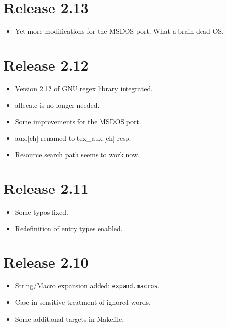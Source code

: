 \documentclass[11pt,a4paper]{scrartcl}
\newcommand\rsc[1]{\texttt{#1}}
\newcommand\File[1]{\textsf{#1}}
\newenvironment{Release}[2]{%
  \def\tmp{#2}%
  \section*{Release #1 \ifx\tmp\empty\else{\normalsize[#2]}\fi}
  \begin{itemize}
}{\end{itemize}}
\newenvironment{Fix}[1]{\item }{}
\newenvironment{New}[1]{\item }{}
\newenvironment{Update}[1]{\item }{}
\begin{document}
\begin{multicols}
 \begin{Release}{2.13}{}
  \begin{New}{gene}
    Yet more modifications for the MSDOS port. What a brain-dead OS.
  \end{New}
 \end{Release}

 \begin{Release}{2.12}{}
  \begin{Update}{gene}
    Version 2.12 of GNU regex library integrated.
  \end{Update}
  \begin{Update}{gene}
    \File{alloca.c} is no longer needed.
  \end{Update}
  \begin{Fix}{gene}
    Some improvements for the MSDOS port.
  \end{Fix}
  \begin{Fix}{gene}
    \File{aux.[ch]} renamed to \File{tex\_aux.[ch]} resp.
  \end{Fix}
  \begin{Fix}{gene}
    Resource search path seems to work now.
  \end{Fix}
 \end{Release}

 \begin{Release}{2.11}{}
  \begin{Fix}{gene}
    Some typos fixed.
  \end{Fix}
  \begin{Update}{gene}
	Redefinition of entry types enabled.
  \end{Update}
 \end{Release}

 \begin{Release}{2.10}{}
  \begin{New}{gene}
    String/Macro expansion added: \rsc{expand.macros}.
  \end{New}
  \begin{Update}{gene}
    Case in-sensitive treatment of ignored words.
  \end{Update}
  \begin{Update}{gene}
    Some additional targets in \File{Makefile}.
  \end{Update}
 \end{Release}


\end{multicols}
\end{document}
